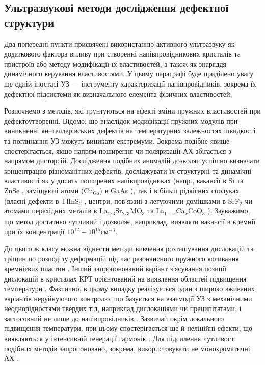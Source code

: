\subsection{Ультразвукові методи дослідження дефектної структури\label{secUSMethod}}

Два попередні пункти присвячені використанню активного ультразвуку як додаткового фактора впливу при створенні напівпровідникових кристалів та пристроїв або  методу модифікації їх властивостей, а також як знаряддя динамічного керування властивостями.
У цьому параграфі буде приділено увагу ще одній іпостасі УЗ --- інструменту характеризації напівпровідників, зокрема їх дефектної підсистеми як визначального елемента фізичних властивостей.


Розпочнемо з методів, які грунтуються на ефекті зміни пружних властивостей при дефектоутворенні.
 Відомо, що внаслідок модифікації пружних модулів при виникненні ян--теллерівських дефектів на температурних залежностях швидкості та поглинання УЗ можуть виникати екстремуми.
Зокрема подібне явище спостерігається, якщо напрям поширення чи поляризації АХ збігається з напрямом дисторсій.
Дослідження подібних аномалій дозволяє успішно визначати концентрацію різноманітних дефектів, досліджувати їх структурні та динамічні властивості
як у досить поширених напівпровідниках (напр., вакансії в Si \cite{USM:Goto2006,USM:Okabe2013,USM:Mitsumoto2014,USM:Akatsu2009} та ZnSe \cite{USM:Averkin2014},
заміщуючі атоми (Cu$_\text{Ga}$) в GaAs \cite{USM:Averkin2014:2}),
так і в більш рідкісних сполуках (власні дефекти в TlInS$_2$ \cite{USM:SEYIDOV2016}, центри, пов'язані з легуючими домішками в SrF$_2$ \cite{USM:Zhevstovskikh} чи атомами перехідних металів в La$_{1/3}$Sr$_{2/3}$MO$_3$ \cite{USM:HUI2012} та La$_{1-x}$Ca$_x$CoO$_3$ \cite{USM:YI2009}).
Зауважимо, що метод достатньо чутливий і дозволяє, наприклад, виявляти вакансії в кремнії  при їх концентрації $10^{12}\div10^{15}$см$^{-3}$.


До цього ж класу можна віднести методи вивчення розташування дислокацій та тріщин по розподілу деформацій під час резонансного пружного коливання кремнієвих пластин \cite{BELYAEV2001,OstapConf2,OstapConf3,Ostap:Method}.
Інший запропонований варіант з'ясування позиції дислокацій в кристалах КРТ орієнтований на виявлення областей підвищення температури \cite{savkina2004disl,SAVKINA2005disl}.
Фактично, в цьому випадку реалізується один з широко вживаних варіантів неруйнуючого контролю, що базується на взаємодії УЗ з механічними неоднорідностями твердих тіл, наприклад дислокаціями чи преципітатами, і застосовний не лише до напівпровідників \cite{USM:NDEsteel}.
Зазвичай окрім локального підвищення температури, при цьому спостерігається ще й нелінійні ефекти, що виявляються у інтенсивній генерації гармонік \cite{USM:NDEsteel,USM:NDE}.
Для підсилення чутливості подібних методів запропоновано, зокрема, використовувати не монохроматичні АХ  \cite{USM:NDE}.

